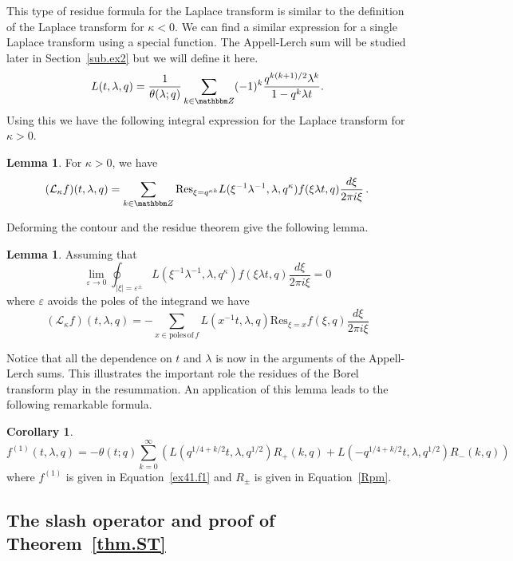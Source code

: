 \documentclass[12pt,reqno]{amsart}
\theoremstyle{definition}
\newtheorem{lemma}[theorem]{Lemma}
\newtheorem{corollary}[theorem]{Corollary}
\def\BZ{\mathbbm Z}
\def\Res{\mathrm{Res}}
\def\ve{\varepsilon}
\def\be{\begin{equation}}
\def\ee{\end{equation}}
\def\Lap{\mathcal{L}}
\begin{document}
This type of residue formula for the Laplace transform is similar to the definition
of the Laplace transform for $\kappa<0$. We can find a similar expression for a single
Laplace transform using a special function. The Appell-Lerch sum will be studied later
in Section~\ref{sub.ex2} but we will define it here.
\be
L(t,\lambda,q)
=
\frac{1}{\theta(\lambda;q)}\sum_{k\in\BZ}(-1)^{k}
\frac{q^{k(k+1)/2}\lambda^{k}}{1-q^{k}\lambda t}.
\ee
Using this we have the following integral expression for the Laplace transform for
$\kappa>0$.

\begin{lemma}
For $\kappa>0$, we have  
\be
(\Lap_{\kappa}f)(t,\lambda,q) =
\sum_{k\in\BZ}\Res_{\xi=q^{\kappa k}}L(\xi^{-1}\lambda^{-1},\lambda,q^{\kappa})
f(\xi\lambda t,q)\frac{d\xi}{2\pi i\xi} \,.
\ee
\end{lemma}

Deforming the contour and the residue theorem give the following lemma.

\begin{lemma}
  Assuming that
  \be
\lim_{\ve\rightarrow 0}
\oint_{|\xi|=\ve^{\pm}}
L(\xi^{-1}\lambda^{-1},\lambda,q^{\kappa})
f(\xi\lambda t,q)\frac{d\xi}{2\pi i\xi}
=0
  \ee
  where $\ve$ avoids the poles of the integrand we have
  \be
(\Lap_{\kappa}f)(t,\lambda,q)
=
-\sum_{x\in\mathrm{poles\,of}\,f}
L(x^{-1}t,\lambda,q)
\Res_{\xi=x}f(\xi,q)\frac{d\xi}{2\pi i\xi}
  \ee
\end{lemma}
Notice that all the dependence on $t$ and $\lambda$ is now in the arguments of
the Appell-Lerch sums. This illustrates the important role the residues of the
Borel transform play in the resummation. An application of this lemma leads to
the following remarkable formula.

\begin{corollary}
  \be
f^{(1)}(t,\lambda,q)
=
-\theta(t;q)\sum_{k=0}^{\infty}
\left(L(q^{1/4+k/2}t,\lambda,q^{1/2})R_{+}(k,q)
  +L(-q^{1/4+k/2}t,\lambda,q^{1/2})R_{-}(k,q)\right)
  \ee
  where $f^{(1)}$ is given in Equation~\eqref{ex41.f1} and $R_{\pm}$ is given
  in Equation~\eqref{Rpm}.
\end{corollary}

\subsection{The slash operator and proof of Theorem~\ref{thm.ST}}
\label{sub.slash}
\end{document}
